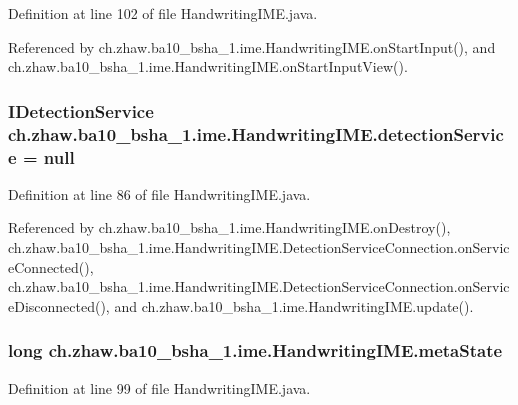 Definition at line 102 of file HandwritingIME.java.

Referenced by ch.zhaw.ba10\_\-bsha\_\-1.ime.HandwritingIME.onStartInput(), and ch.zhaw.ba10\_\-bsha\_\-1.ime.HandwritingIME.onStartInputView().\hypertarget{classch_1_1zhaw_1_1ba10__bsha__1_1_1ime_1_1HandwritingIME_adb6575df144036d95d8e2fb029218c4d}{
\subsubsection[{detectionService}]{\setlength{\rightskip}{0pt plus 5cm}IDetectionService {\bf ch.zhaw.ba10\_\-bsha\_\-1.ime.HandwritingIME.detectionService} = null}}
\label{classch_1_1zhaw_1_1ba10__bsha__1_1_1ime_1_1HandwritingIME_adb6575df144036d95d8e2fb029218c4d}


Definition at line 86 of file HandwritingIME.java.

Referenced by ch.zhaw.ba10\_\-bsha\_\-1.ime.HandwritingIME.onDestroy(), ch.zhaw.ba10\_\-bsha\_\-1.ime.HandwritingIME.DetectionServiceConnection.onServiceConnected(), ch.zhaw.ba10\_\-bsha\_\-1.ime.HandwritingIME.DetectionServiceConnection.onServiceDisconnected(), and ch.zhaw.ba10\_\-bsha\_\-1.ime.HandwritingIME.update().\hypertarget{classch_1_1zhaw_1_1ba10__bsha__1_1_1ime_1_1HandwritingIME_a5fcd0c226a96c4fb7549fba822b49d2a}{
\subsubsection[{metaState}]{\setlength{\rightskip}{0pt plus 5cm}long {\bf ch.zhaw.ba10\_\-bsha\_\-1.ime.HandwritingIME.metaState}}}
\label{classch_1_1zhaw_1_1ba10__bsha__1_1_1ime_1_1HandwritingIME_a5fcd0c226a96c4fb7549fba822b49d2a}


Definition at line 99 of file HandwritingIME.java.

